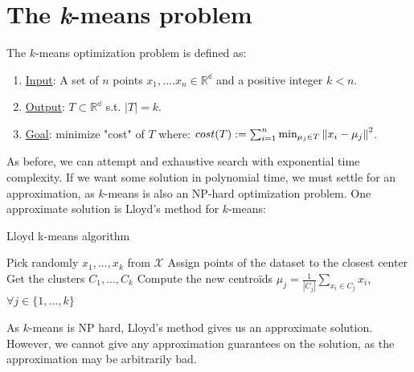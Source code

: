 \section{The \emph{k}-means problem}
The $k$-means optimization problem is defined as:
\begin{enumerate}
\item \underline{Input}: A set of $n$ points $x_1,....x_n \in
\mathbb{R^d}$ and a positive integer $k<n$.
\item \underline{Output}: $T \subset  \mathbb{R^d}$ s.t. $|T|=k$. 
\item \underline{Goal}: minimize "cost" of $T$ where: $cost(T) 
:= \sum_{i = 1}^{n} \min_{\mu_j \in T} \left\lVert x_i-\mu_j\right\rVert^2 $.
\end{enumerate}

As before, we can attempt and exhaustive search with exponential
time complexity. If we want some solution in polynomial time, we
must settle for an approximation, as $k$-means is also an NP-hard
optimization problem. One approximate solution is Lloyd's method
for $k$-means:

\begin{algorithm}
\caption{Lloyd k-means algorithm}
\begin{algorithmic} 
\STATE Pick randomly $x_1,...,x_k $ from $\mathcal{X}$ \;
\STATE Assign points of the dataset to the closest center \;
\STATE Get the clusters $C_1, ..., C_k$\;
\STATE Compute the new centroïds $\mu_j = \frac{1}{|C_j|}
\sum_{x_i\in C_j} x_i$, $\forall j \in \{1,...,k\}$\;
\ENDWHILE
\end{algorithmic}
\end{algorithm}

\begin{remark}
As $k$-means is NP hard, Lloyd's method gives us an approximate
solution. However, we cannot give any approximation guarantees
on the solution, as the approximation may be arbitrarily bad.
\end{remark}

